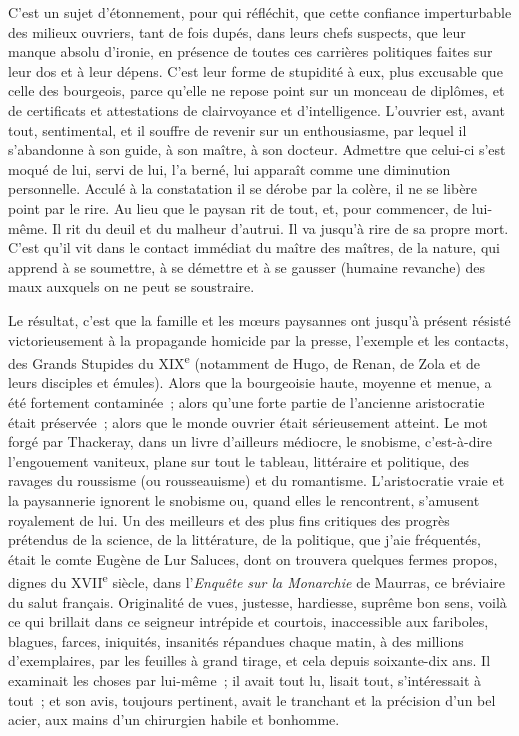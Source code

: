 \documentclass[french,twoside]{book} %
\begin{document}
C’est un sujet d’étonnement, pour qui réfléchit, que cette confiance imperturbable des milieux ouvriers, tant de fois dupés, dans leurs chefs suspects, que leur manque absolu d’ironie, en présence de toutes ces carrières politiques faites sur leur dos et à leur dépens. C’est leur forme de stupidité à eux, plus excusable que celle des bourgeois, parce qu’elle ne repose point sur un monceau de diplômes, et de certificats et attestations de clairvoyance et d’intelligence. L’ouvrier est, avant tout, sentimental, et il souffre de revenir sur un enthousiasme, par lequel il s’abandonne à son guide, à son maître, à son docteur. Admettre que celui-ci s’est moqué de lui, servi de lui, l’a berné, lui apparaît comme une diminution personnelle. Acculé à la constatation il se dérobe par la colère, il ne se libère point par le rire. Au lieu que le paysan rit de tout, et, pour commencer, de lui-même. Il rit du deuil et du malheur d’autrui. Il va jusqu’à rire de sa propre mort. C’est qu’il vit dans le contact immédiat du maître des maîtres, de la nature, qui apprend à se soumettre, à se démettre et à se gausser (humaine revanche) des maux auxquels on ne peut se soustraire.\par
Le résultat, c’est que la famille et les mœurs paysannes ont jusqu’à présent résisté victorieusement à la propagande homicide par la presse, l’exemple et les contacts, des Grands Stupides du XIX\textsuperscript{e} (notamment de Hugo, de Renan, de Zola et de leurs disciples et émules). Alors que la bourgeoisie haute, moyenne et menue, a été fortement contaminée ; alors qu’une forte partie de l’ancienne aristocratie était préservée ; alors que le monde ouvrier était sérieusement atteint. Le mot forgé par Thackeray, dans un livre d’ailleurs médiocre, le snobisme, c’est-à-dire l’engouement vaniteux, plane sur tout le tableau, littéraire et politique, des ravages du roussisme (ou rousseauisme) et du romantisme. L’aristocratie vraie et la paysannerie ignorent le snobisme ou, quand elles le rencontrent, s’amusent royalement de lui. Un des meilleurs et des plus fins critiques des progrès prétendus de la science, de la littérature, de la politique, que j’aie fréquentés, était le comte Eugène de Lur Saluces, dont on trouvera quelques fermes propos, dignes du XVII\textsuperscript{e} siècle, dans l’{\itshape Enquête sur la Monarchie} de Maurras, ce bréviaire du salut français. Originalité de vues, justesse, hardiesse, suprême bon sens, voilà ce qui brillait dans ce seigneur intrépide et courtois, inaccessible aux fariboles, blagues, farces, iniquités, insanités répandues chaque matin, à des millions d’exemplaires, par les feuilles à grand tirage, et cela depuis soixante-dix ans. Il examinait les choses par lui-même ; il avait tout lu, lisait tout, s’intéressait à tout ; et son avis, toujours pertinent, avait le tranchant et la précision d’un bel acier, aux mains d’un chirurgien habile et bonhomme.\par
\end{document}
